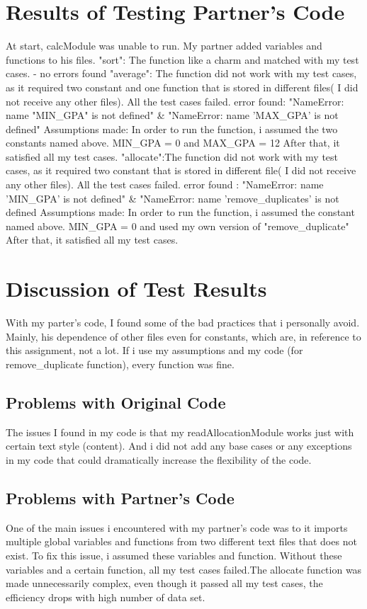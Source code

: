 \documentclass[12pt]{article}
\begin{document}
\section{Results of Testing Partner's Code}
At start, calcModule was unable to run. My partner added variables and functions to his files.
"sort": The function like a charm and matched with my test cases. - no errors found
"average":  The function did not work with my test cases, as it required two constant and one function that is stored in different files( I did not receive any other files).
		All the test cases failed.  error found: "NameError: name "MIN\_GPA" is not defined" \&
				                                         "NameError: name 'MAX\_GPA' is not defined"
	Assumptions made:
		In order to run the function, i assumed the two constants named above. MIN\_GPA = 0 and MAX\_GPA = 12
		After that, it satisfied all my test cases.
"allocate":The function did not work with my test cases, as it required two constant that is stored in different file( I did not receive any other files).
		All the test cases failed. error found : "NameError: name 'MIN\_GPA' is not defined" \&
									"NameError: name 'remove\_duplicates' is not defined
	Assumptions made:
		In order to run the function, i assumed the constant named above. MIN\_GPA = 0 and used my own version of "remove\_duplicate"
		After that, it satisfied all my test cases.


\section{Discussion of Test Results}
With my parter's code, I found some of the bad practices that i personally avoid.
Mainly, his dependence of other files even for constants, which are, in reference to this assignment, not a lot.
If i use my assumptions and my code (for remove\_duplicate function), every function was fine.

\subsection{Problems with Original Code}
The issues I found in my code is that my readAllocationModule works just with certain text style (content).
And i did not add any base cases or any exceptions in my code that could dramatically increase the flexibility of the code.

\subsection{Problems with Partner's Code}
One of the main issues i encountered with my partner's code was to it imports multiple global variables and functions from two different text files that does not exist. To fix this issue, i assumed these variables and function. Without these variables and a certain function, all my test cases failed.The allocate function was made unnecessarily complex, even though it passed all my test cases, the efficiency drops with high number of data set. 
\end{document}
